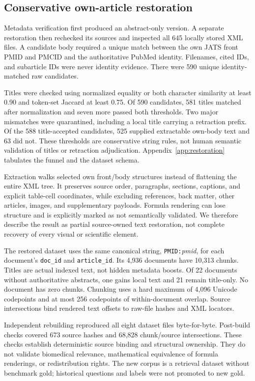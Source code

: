 \subsection{Conservative own-article restoration}
Metadata verification first produced an abstract-only version. A separate restoration then rechecked its sources and inspected all 645 locally stored XML files. A candidate body required a unique match between the own JATS front PMID and PMCID and the authoritative PubMed identity. Filenames, cited IDs, and subarticle IDs were never identity evidence. There were 590 unique identity-matched raw candidates.

Titles were checked using normalized equality or both character similarity at least 0.90 and token-set Jaccard at least 0.75. Of 590 candidates, 581 titles matched after normalization and seven more passed both thresholds. Two major mismatches were quarantined, including a local title carrying a retraction prefix. Of the 588 title-accepted candidates, 525 supplied extractable own-body text and 63 did not. These thresholds are conservative string rules, not human semantic validation of titles or retraction adjudication. Appendix~\ref{app:restoration} tabulates the funnel and the dataset schema.

Extraction walks selected own front/body structures instead of flattening the entire XML tree. It preserves source order, paragraphs, sections, captions, and explicit table-cell coordinates, while excluding references, back matter, other articles, images, and supplementary payloads. Formula rendering can lose structure and is explicitly marked as not semantically validated. We therefore describe the result as partial source-owned text restoration, not complete recovery of every visual or scientific element.

The restored dataset uses the same canonical string, \texttt{PMID:}\emph{pmid}, for each document's \texttt{doc\_id} and \texttt{article\_id}. Its 4,936 documents have 10,313 chunks. Titles are actual indexed text, not hidden metadata boosts. Of 22 documents without authoritative abstracts, one gains local text and 21 remain title-only. No document has zero chunks. Chunking uses a hard maximum of 4,096 Unicode codepoints and at most 256 codepoints of within-document overlap. Source intersections bind rendered text offsets to raw-file hashes and XML locators.

Independent rebuilding reproduced all eight dataset files byte-for-byte. Post-build checks covered 673 source hashes and 68,828 chunk/source intersections. These checks establish deterministic source binding and structural ownership. They do not validate biomedical relevance, mathematical equivalence of formula renderings, or redistribution rights. The new corpus is a retrieval dataset without benchmark gold; historical questions and labels were not promoted to new gold.

